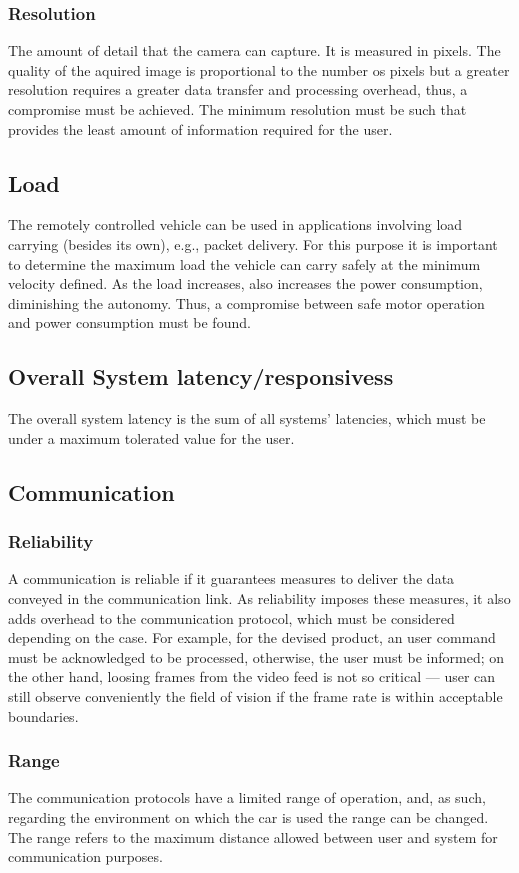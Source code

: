\subsubsection{Resolution}%
\label{sec:orgba87554}%
The amount of detail that the camera can capture. It is measured in pixels. The quality of the aquired image is proportional to the number os pixels but a greater resolution requires a greater data transfer and processing overhead, thus, a compromise must be achieved. The minimum resolution must be such that provides the least amount of information required for the user. 
\subsection{Load}%
\label{sec:orgca6a690}
The remotely controlled vehicle can be used in applications involving load
carrying (besides its own), e.g., packet delivery. For this purpose it is
important to determine the maximum load the vehicle can carry safely at the
minimum velocity deﬁned. As the load increases, also increases the power
consumption, diminishing the autonomy. Thus, a compromise between safe motor
operation and power consumption must be found.
\subsection{Overall System latency/responsivess}%
\label{sec:org7fd1829}
The overall system latency is the sum of all systems' latencies, which must be under a maximum tolerated value for the user.
\subsection{Communication}%
\label{sec:org4241610}
\subsubsection{Reliability}%
\label{sec:orgdcb920d}
A communication is reliable if it guarantees measures to deliver the data
conveyed in the communication link. As reliability imposes these measures, it
also adds overhead to the communication protocol, which must be considered
depending on the case. For example, for the devised product, an user command
must be acknowledged to be processed, otherwise, the user must be informed; on
the other hand, loosing frames from the video feed is not so critical — user can
still observe conveniently the ﬁeld of vision if the frame rate is within
acceptable boundaries.
\subsubsection{Range}%
\label{sec:org447a205}
The communication protocols have a limited range of operation, and, as such, regarding the environment on which the car is used the range can be changed.
The range refers to the maximum distance allowed between user and system for communication purposes.
